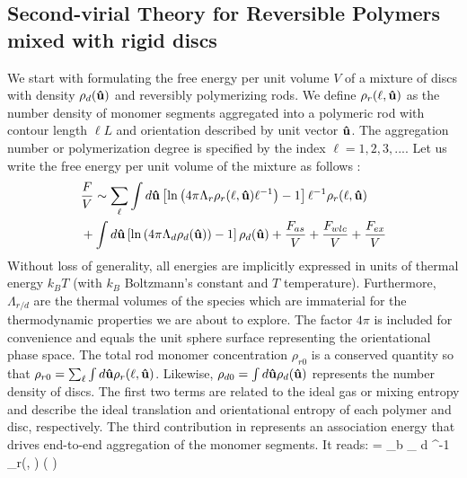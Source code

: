  
\subsection{Second-virial Theory for Reversible Polymers mixed with rigid discs}


We start with formulating the free energy per unit volume $V$ of a mixture of discs with density $\rho_{d}({\bf \hat{u}}) $ and reversibly polymerizing rods. We define $\rho_{r}(\ell, {\bf \hat{u}})$ as the number density of monomer segments  aggregated into a polymeric rod with contour length $\ell L$  and orientation described by unit vector ${\bf \hat{u}}$.  The aggregation number or polymerization degree is specified by the index $\ell =1,2,3,...$.  Let us write the free energy per unit volume of the mixture as follows \cite{kuriabova2010,wensink_mm2019}:
 \begin{align}
& \frac{  F}{ V}  \sim  \sum_{\ell} \int  d {\bf \hat{u}}   \left [ \ln \left (4 \pi \Lambda_{r} \rho_{r} (\ell, {\bf \hat{u}}) \ell^{-1}  \right ) - 1 \right ] \ell^{-1} \rho_{r} (\ell, {\bf \hat{u}}) \nonumber \\ 
& +     \int  d {\bf \hat{u}}   \left [ \ln \left ( 4 \pi \Lambda_{d} \rho_{d} ( {\bf \hat{u}})   \right ) - 1 \right ]  \rho_{d} ({\bf \hat{u}})  + \frac{F_{as}}{V} +  \frac{F_{wlc}}{V} + \frac{F_{ex}}{V} \nonumber \\ 
 \label{free}
\end{align}
Without loss of generality,  all energies are implicitly expressed in units of thermal energy $k_{B}T$ (with $k_{B}$ Boltzmann's constant and $T$ temperature). Furthermore, $\Lambda_{r/d}$ are the thermal volumes of the species  which are immaterial for the thermodynamic properties we are about to explore. The factor $4 \pi$ is included for convenience and equals the unit sphere surface representing the orientational phase space. 
The total rod monomer concentration $\rho_{r0}$ is a conserved quantity so that $\rho_{r0} = \sum_{\ell} \int  d {\bf \hat{u}} \rho_{r}(\ell, {\bf \hat{u}} )$. Likewise, $\rho_{d0} = \int d {\bf \hat{u}} \rho_{d} ({\bf \hat{u}})$ represents the number  density of discs.
The first two terms are related to the ideal gas or mixing entropy and describe the ideal translation and orientational entropy of each polymer  and disc, respectively.
The third contribution in  represents an association energy that drives end-to-end aggregation of the  monomer segments. It reads: 
 \beq
{}  =  \varepsilon_{b}  \sum_{\ell} \int d \oma \ell^{-1} \rho_{r}(\ell, \oma) ( ) 
 \label{fas} 
 \eeq
